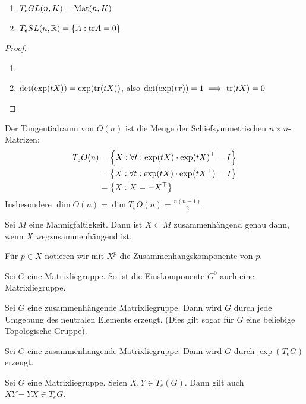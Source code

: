\documentclass{report}
\begin{document}
\begin{corollary}
	\begin{enumerate}
		\item $T_eGL(n, K) = \textnormal{Mat}(n, K)$
		\item $T_eSL(n, \mathbb{R}) = \qty{A : \textnormal{tr}A = 0}$
	\end{enumerate}
\end{corollary}
\begin{proof}
	\begin{enumerate}
		\item 
		\item $\det (\exp(tX)) = \exp(\textnormal{tr}(tX))$, also $\det(\exp(tx)) = 1 \implies \textnormal{tr}(tX) = 0$ 
	\end{enumerate}
\end{proof}
\begin{corollary}
	Der Tangentialraum von $O(n)$ ist die Menge der Schiefsymmetrischen $n \times n$-Matrizen:
	\begin{align*}
		T_eO(n) 
		&= \qty{X : \forall t : \exp(tX) \cdot \exp(tX)^\top = I}\\
		&= \qty{X : \forall t : \exp(tX) \cdot \exp(tX^\top) = I}\\
		&= \qty{X : X = -X^\top}
	\end{align*}
	Insbesondere $\dim O(n) = \dim T_eO(n) = \frac{n(n-1)}{2}$
\end{corollary}
\begin{proposition}
	Sei $M$ eine Mannigfaltigkeit. Dann ist $X \subset M$ zusammenhängend genau dann, wenn $X$ wegzusammenhängend ist.
\end{proposition}
\begin{definition}
	Für $p \in X$ notieren wir mit $X^p$ die Zusammenhangskomponente von $p$.
\end{definition}
\begin{theorem}
	Sei $G$ eine Matrixliegruppe. So ist die Einskomponente $G^0$ auch eine Matrixliegruppe.
\end{theorem}
\begin{lemma}
	Sei $G$ eine zusammenhängende Matrixliegruppe. Dann wird $G$ durch jede Umgebung des neutralen Elements erzeugt. (Dies gilt sogar für $G$ eine beliebige Topologische Gruppe).
\end{lemma}
\begin{corollary}
	Sei $G$ eine zusammenhängende Matrixliegruppe. Dann wird $G$ durch $\exp(T_eG)$ erzeugt.
\end{corollary}
\begin{theorem}
	Sei $G$ eine Matrixliegruppe. Seien $X,Y \in T_e(G)$. Dann gilt auch $XY - YX \in T_eG$.
\end{theorem}
\end{document}
